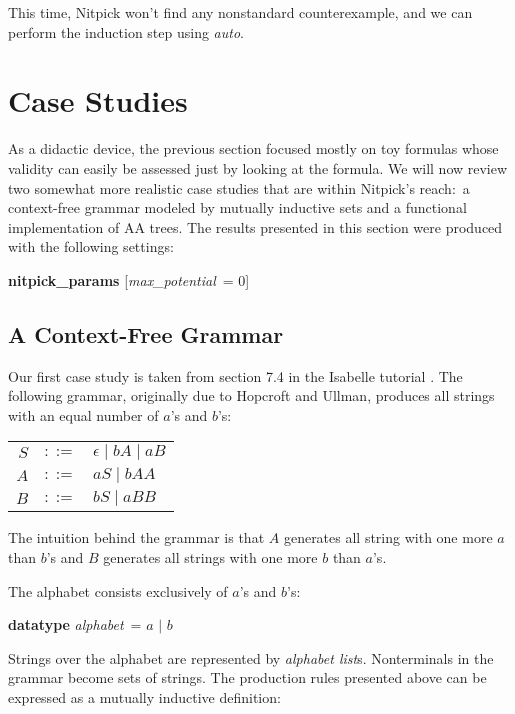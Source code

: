 \documentclass[a4paper,12pt]{article}
\begin{document}
This time, Nitpick won't find any nonstandard counterexample, and we can perform
the induction step using \textit{auto}.

\section{Case Studies}
\label{case-studies}

As a didactic device, the previous section focused mostly on toy formulas whose
validity can easily be assessed just by looking at the formula. We will now
review two somewhat more realistic case studies that are within Nitpick's
reach:\ a context-free grammar modeled by mutually inductive sets and a
functional implementation of AA trees. The results presented in this
section were produced with the following settings:

\prew
\textbf{nitpick\_params} [\textit{max\_potential}~= 0]
\postw

\subsection{A Context-Free Grammar}
\label{a-context-free-grammar}

Our first case study is taken from section 7.4 in the Isabelle tutorial
\cite{isa-tutorial}. The following grammar, originally due to Hopcroft and
Ullman, produces all strings with an equal number of $a$'s and $b$'s:

\prew
\begin{tabular}{@{}r@{$\;\,$}c@{$\;\,$}l@{}}
$S$ & $::=$ & $\epsilon \mid bA \mid aB$ \\
$A$ & $::=$ & $aS \mid bAA$ \\
$B$ & $::=$ & $bS \mid aBB$
\end{tabular}
\postw

The intuition behind the grammar is that $A$ generates all string with one more
$a$ than $b$'s and $B$ generates all strings with one more $b$ than $a$'s.

The alphabet consists exclusively of $a$'s and $b$'s:

\prew
\textbf{datatype} \textit{alphabet}~= $a$ $\mid$ $b$
\postw

Strings over the alphabet are represented by \textit{alphabet list}s.
Nonterminals in the grammar become sets of strings. The production rules
presented above can be expressed as a mutually inductive definition:
\end{document}
